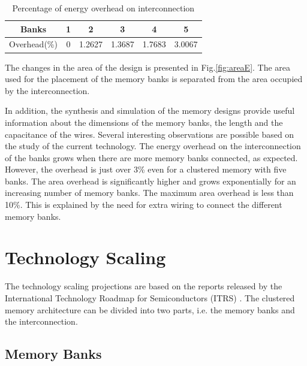  \begin{table}[t!]
\caption{Percentage of energy overhead on interconnection}
\label{tab:overhead}
\centering
\begin{tabular}{|c|c|c|c|c|c|}
\hline 
Banks & 1 & 2 & 3 & 4 & 5 \\
\hline 
Overhead(\%) & 0	&	1.2627 & 1.3687 & 1.7683 & 3.0067 \\ 
 \hline 
 \end{tabular} 
\end{table} 
 
The changes in the area of the design is presented in Fig.\ref{fig:areaE}.
The area used for the placement of the memory banks is separated from the area occupied by the interconnection.
  
In addition, the synthesis and simulation of the memory designs provide useful information about the dimensions of the memory banks, the length and the capacitance of the wires.
Several interesting observations are possible based on the study of the current technology.
The energy overhead on the interconnection of the banks grows when there are more memory banks connected, as expected.
However, the overhead is just over 3\% even for a clustered memory with five banks. 
The area overhead is significantly higher and grows exponentially for an increasing number of memory banks.  
The maximum area overhead is less than 10\%.
This is explained by the need for extra wiring to connect the different memory banks.

\section{Technology Scaling}

The technology scaling projections are based on the reports released by the International Technology Roadmap for Semiconductors (ITRS) \cite{itrs}.
The clustered memory architecture can be divided into two parts, i.e. the memory banks and the interconnection.

\subsection{Memory Banks}

